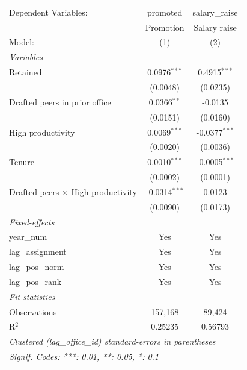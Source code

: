 
\begingroup
\centering
\begin{tabular}{lcc}
   \tabularnewline \midrule \midrule
   Dependent Variables:                      & promoted        & salary\_raise\\   
                                             & Promotion       & Salary raise \\   
   Model:                                    & (1)             & (2)\\  
   \midrule
   \emph{Variables}\\
   Retained                                  & 0.0976$^{***}$  & 0.4915$^{***}$\\   
                                             & (0.0048)        & (0.0235)\\   
   Drafted peers in prior office             & 0.0366$^{**}$   & -0.0135\\   
                                             & (0.0151)        & (0.0160)\\   
   High productivity                         & 0.0069$^{***}$  & -0.0377$^{***}$\\   
                                             & (0.0020)        & (0.0036)\\   
   Tenure                                    & 0.0010$^{***}$  & -0.0005$^{***}$\\   
                                             & (0.0002)        & (0.0001)\\   
   Drafted peers $\times$ High productivity  & -0.0314$^{***}$ & 0.0123\\   
                                             & (0.0090)        & (0.0173)\\   
   \midrule
   \emph{Fixed-effects}\\
   year\_num                                 & Yes             & Yes\\  
   lag\_assignment                           & Yes             & Yes\\  
   lag\_pos\_norm                            & Yes             & Yes\\  
   lag\_pos\_rank                            & Yes             & Yes\\  
   \midrule
   \emph{Fit statistics}\\
   Observations                              & 157,168         & 89,424\\  
   R$^2$                                     & 0.25235         & 0.56793\\  
   \midrule \midrule
   \multicolumn{3}{l}{\emph{Clustered (lag\_office\_id) standard-errors in parentheses}}\\
   \multicolumn{3}{l}{\emph{Signif. Codes: ***: 0.01, **: 0.05, *: 0.1}}\\
\end{tabular}
 
